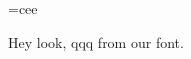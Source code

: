 \documentclass{article}
\begin{document}
\font\myfont=cee

Hey look, {\myfont qqq} from our font.
\end{document}
